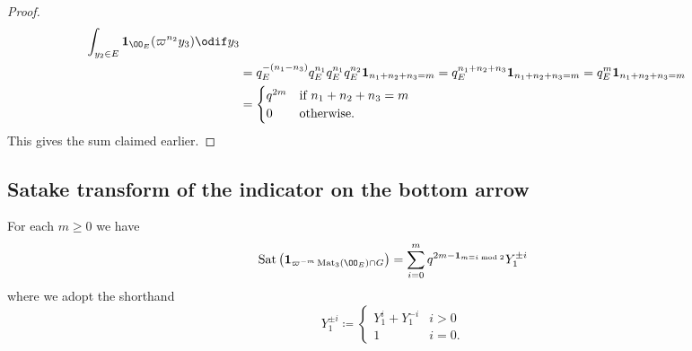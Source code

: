 \begin{proof}
\begin{align*}
    \int_{y_2 \in E} \mathbf{1}_{\OO_E}(\varpi^{n_2} y_3) \odif y_3 \\
    &= q_E^{-(n_1-n_3)} q_E^{n_1} q_E^{n_1} q_E^{n_2} \mathbf{1}_{n_1+n_2+n_3=m}
    = q_E^{n_1+n_2+n_3}\mathbf{1}_{n_1+n_2+n_3=m}
    = q_E^{m}\mathbf{1}_{n_1+n_2+n_3=m} \\
    &= \begin{cases}
      q^{2m} & \text{if }n_1 + n_2 + n_3 = m \\
      0 & \text{otherwise}.
    \end{cases}
  \end{align*}
  This gives the sum claimed earlier.
\end{proof}

\subsection{Satake transform of the indicator on the bottom arrow}
\begin{proposition}
  For each $m \ge 0$ we have
  \[ \Sat\left(\mathbf{1}_{\varpi^{-m} \Mat_3(\OO_E) \cap G}\right)
    = \sum_{i=0}^m q^{2m - \mathbf{1}_{m \equiv i \bmod 2}} Y_1^{\pm i} \]
  where we adopt the shorthand
  \[
    Y_1^{\pm i} \coloneqq
    \begin{cases}
      Y_1^i + Y_1^{-i} & i > 0 \\
      1 & i = 0 .
    \end{cases}
  \]
\end{proposition}
